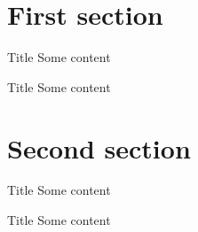 \documentclass{beamer}
\begin{document}
\section{First section}

\begin{frame}{Title}
  Some content
\end{frame}

\begin{frame}{Title}
  Some content
\end{frame}

\section{Second section}

\begin{frame}{Title}
  Some content
\end{frame}

\begin{frame}{Title}
  Some content
\end{frame}
\end{document}
